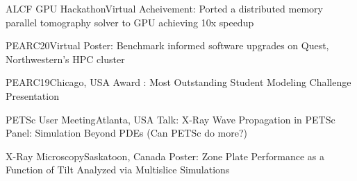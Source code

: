 {ALCF GPU Hackathon}{Virtual} 
{\newline Acheivement: Ported a distributed memory parallel tomography solver to GPU achieving 10x speedup}
{}
{}


{PEARC20}{Virtual} 
{\newline Poster: Benchmark informed software upgrades on Quest, Northwestern’s HPC cluster}
{}
{}


{PEARC19}{Chicago, USA} 
{\newline Award : Most Outstanding Student Modeling Challenge Presentation}
{}
{}

{PETSc User Meeting}{Atlanta, USA}
{\newline Talk: X-Ray Wave Propagation in PETSc} 
{\newline Panel: Simulation Beyond PDEs (Can PETSc do more?)}
{}


{X-Ray Microscopy}{Saskatoon, Canada}
{\newline Poster: Zone Plate Performance as a Function of Tilt Analyzed via Multislice Simulations} 
{}
{}


